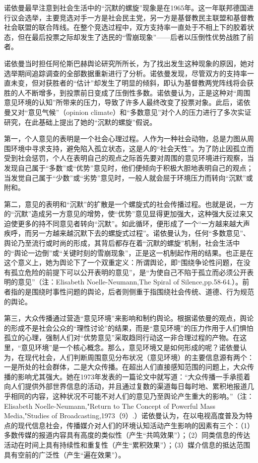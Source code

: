 \documentclass[UTF8,12pt]{ctexart}
\numberwithin{equation}{section} %
\numberwithin{figure}{section}
\numberwithin{table}{section}
\begin{document}
	诺依曼最早注意到社会生活中的“沉默的螺旋”现象是在1965年。这一年联邦德国进行议会选举，主要竞选对手一方是社会民主党，另一方是基督教民主联盟和基督教社会联盟的联合阵线。在整个竞选过程中，双方支持率一直处于不相上下的胶着状态，但在最后投票之际却发生了选民的“雪崩现象”——后者以压倒性优势战胜了前者。
	
	诺依曼当时担任阿伦斯巴赫舆论研究所所长，为了找出发生这种现象的原因，她对选举期间追踪调查的全部数据重新进行了分析。诺依曼发现，尽管双方的支持率一直未变，但对获胜者的“估计”却发生了明显的倾斜，即认为基督教两党阵线将会获胜的人不断增多，到投票前日变成了压倒性多数。诺依曼认为，正是这种对“周围意见环境的认知”所带来的压力，导致了许多人最终改变了投票对象。此后，诺依曼又对“意见气候”（opinion climate）和“多数意见”对个人的压力进行了多次实证研究，在此基础上提出了她的“沉默的螺旋”假说。
	
	第一，个人意见的表明是一个社会心理过程。人作为一种社会动物，总是力图从周围环境中寻求支持，避免陷入孤立状态，这是人的“社会天性”。为了防止因孤立而受到社会惩罚，个人在表明自己的观点之际首先要对周围的意见环境进行观察，当发现自己属于“多数”或“优势”意见时，他们便倾向于积极大胆地表明自己的观点；当发觉自己属于“少数”或“劣势”意见时，一般人就会屈于环境压力而转向“沉默”或附和。
	
	第二，意见的表明和“沉默”的扩散是一个螺旋式的社会传播过程。也就是说，一方的“沉默”造成另一方意见的增势，使“优势”意见显得更加强大，这种强大反过来又迫使更多的持不同意见者转向“沉默”。如此循环，便形成了一个“一方越来越大声疾呼，而另一方越来越沉默下去的螺旋式过程”。诺依曼认为，任何“多数意见”、舆论乃至流行或时尚的形成，其背后都存在着“沉默的螺旋”机制，社会生活中的“舆论一边倒”或“关键时刻的雪崩现象”，正是这一机制起作用的结果。也正是在这个意义上，她为舆论下了一个双重定义：所谓舆论，即“围绕争论性问题，在没有孤立危险的前提下可以公开表明的意见”，是“为使自己不陷于孤立而必须公开表明的意见”（注：Elisabeth Noelle-Neumann,The Spiral of Silence,pp.58-64.）。前者指的是围绕时事性问题的舆论，后者则侧重于指围绕社会传统、道德、行为规范的舆论。
	
	第三，大众传播通过营造“意见环境”来影响和制约舆论。根据诺依曼的观点，舆论的形成不是社会公众的“理性讨论”的结果，而是“意见环境”的压力作用于人们惧怕孤立的心理，强制人们对“优势意见”采取趋同行动这一非合理过程的产物。在这里，“意见环境”是一个核心概念。那么，意见环境又是如何形成的呢？诺依曼认为，在现代社会，人们判断周围意见分布状况（意见环境）的主要信息源有两个：一是所处的社会群体，二是大众传播。在超出人们直接感知范围的问题上，大众传播的影响尤其强大。她在1973年发表的一篇论文中就写道：“大众传播一手承揽着向人们提供外部世界信息的活动，并且通过复数的渠道每日每时地、累积地报道几乎相同的内容，这种状况不可能不对人们的意见乃至舆论产生重大的影响。”（注：Elisabeth Noelle-Neumann,"Return to The Concept of Powerful Mass Media,"Studies of Broadcasting,1973（9）.）诺依曼认为，在以电视高度普及为特点的现代信息社会，传播媒介对人们的环境认知活动产生影响的因素有三个：（1）多数传媒的报道内容具有高度的类似性（产生“共鸣效果”）；（2）同类信息的传达活动在时间上具有持续性和重复性（产生“累积效果”）；（3）媒介信息的抵达范围具有空前的广泛性（产生“遍在效果”）。
	
\end{document}
